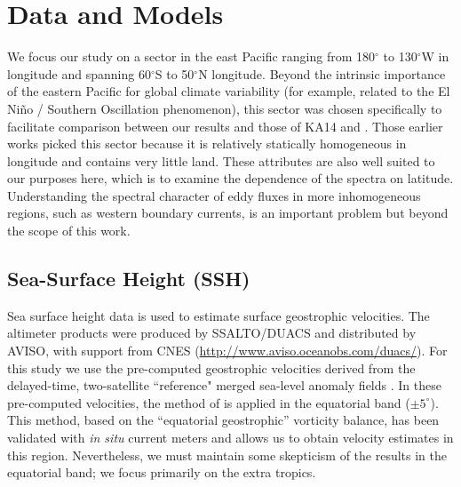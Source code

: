 \documentclass[10pt]{article}
\begin{document}
\section{Data and Models}

We focus our study on a sector in the east Pacific ranging from 180$^\circ$ to 130$^\circ$W in longitude and spanning 60$^\circ$S to 50$^\circ$N longitude. Beyond the intrinsic importance of the eastern Pacific for global climate variability (for example, related to the El Ni\~no / Southern Oscillation phenomenon), this sector was chosen specifically to facilitate comparison between our results and those of KA14 and \citet{AbernatheyMarshall2013}. Those earlier works picked this sector because it is relatively statically homogeneous in longitude and contains very little land. These attributes are also well suited to our purposes here, which is to examine the dependence of the spectra on latitude. Understanding the spectral character of eddy fluxes in more inhomogeneous regions, such as western boundary currents, is an important problem but beyond the scope of this work.

\subsection{Sea-Surface Height (SSH)}
Sea surface height data is used to estimate surface geostrophic velocities. The altimeter products were produced by SSALTO/DUACS and distributed by AVISO, with support from CNES (\url{http://www.aviso.oceanobs.com/duacs/}). For this study we use the pre-computed geostrophic velocities derived from the delayed-time, two-satellite ``reference" merged sea-level anomaly fields . In these pre-computed velocities, the method of \citet{LagerloefEtAl1999} is applied in the equatorial band ($\pm 5^\circ$). This method, based on the ``equatorial geostrophic'' vorticity balance, has been validated with {\em in situ} current meters and allows us to obtain velocity estimates in this region. Nevertheless, we must maintain some skepticism of the results in the equatorial band;  we focus primarily on the extra tropics.
\end{document}
